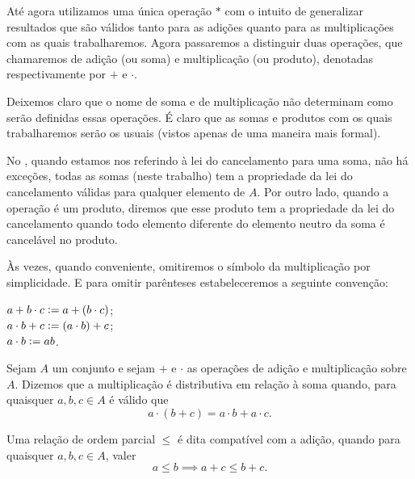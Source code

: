 \documentclass[../main.tex]{subfiles}
\begin{document}
Até agora utilizamos uma única operação $*$ com o intuito de generalizar resultados que são válidos tanto para as adições quanto para as multiplicações com as quais trabalharemos. Agora passaremos a distinguir duas operações, que chamaremos de adição (ou soma) e multiplicação (ou produto), denotadas respectivamente por $+$ e $\cdot$.

Deixemos claro que o nome de soma e de multiplicação não determinam como serão definidas essas operações. É claro que as somas e produtos com os quais trabalharemos serão os usuais (vistos apenas de uma maneira mais formal).

\begin{obs}
    No , quando estamos nos referindo à lei do cancelamento para uma soma, não há exceções, todas as somas (neste trabalho) tem a propriedade da lei do cancelamento válidas para qualquer elemento de $A$. Por outro lado, quando a operação é um produto, diremos que esse produto tem a propriedade da lei do cancelamento quando todo elemento diferente do elemento neutro da soma é cancelável no produto.
\end{obs}

\begin{obs}
	Às vezes, quando conveniente, omitiremos o símbolo da multiplicação por simplicidade. E para omitir parênteses estabeleceremos a seguinte convenção: 
	\begin{center}
    	$a + b \cdot c \vcentcolon= a + (b \cdot c)$;  \\
    	$a \cdot b + c \vcentcolon= (a \cdot b) + c$; \\
    	$a \cdot b \vcentcolon= ab$.    
	\end{center}
\end{obs}

\begin{defi}
    Sejam $A$ um conjunto e sejam $+$ e $\cdot$ as operações de adição e multiplicação sobre $A$. Dizemos que a multiplicação é distributiva em relação à soma quando, para quaisquer $a, b, c \in A$ é válido que \[ a \cdot (b + c) = a \cdot b + a\cdot c. \]
\end{defi}

\begin{defi}
    Uma relação de ordem parcial $\leq$ é dita compatível com a adição, quando para quaisquer $a,b,c \in A$, 
    valer \[ a \leq b \implies a + c \leq b + c. \]
\end{defi}
\end{document}

